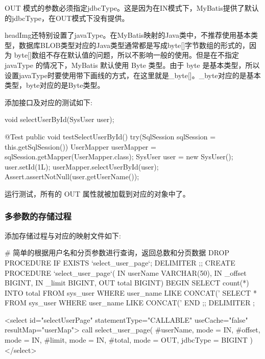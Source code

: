 OUT 模式的参数必须指定jdbcType。这是因为在IN模式下，MyBatis提供了默认的jdbcType，在OUT模式下没有提供。

headImg还特别设置了javaType。在MyBatis映射的Java类中，不推荐使用基本类型，数据库BLOB类型对应的Java类型通常都是写成byte[]字节数组的形式的，因为 byte[]数组不存在默认值的问题，所以不影响一般的使用。但是在不指定javaType 的情况下，MyBatis 默认使用 Byte 类型。由于 byte 是基本类型，所以设置javaType时要使用带下画线的方式，在这里就是\_byte[]。\_byte对应的是基本类型，byte对应的是Byte类型。

添加接口及对应的测试如下:

\begin{xml}
void selectUserById(SysUser user);
\end{xml}

\begin{Java}
@Test
public void testSelectUserById() {
    try(SqlSession sqlSession = this.getSqlSession()) {
        UserMapper userMapper = sqlSession.getMapper(UserMapper.class);
        SysUser user = new SysUser();
        user.setId(1L);
        userMapper.selectUserById(user);
        Assert.assertNotNull(user.getUserName());
    }
}
\end{Java}

运行测试，所有的 OUT 属性就被加载到对应的对象中了。

\subsubsection{多参数的存储过程}

添加存储过程与对应的映射文件如下:

\begin{sql}
# 简单的根据用户名和分页参数进行查询，返回总数和分页数据
DROP PROCEDURE IF EXISTS `select_user_page`;
DELIMITER ;;
CREATE PROCEDURE `select_user_page`(
    IN userName VARCHAR(50),
    IN _offset BIGINT,
    IN _limit BIGINT,
    OUT total BIGINT)
BEGIN
    SELECT count(*) INTO total FROM sys_user WHERE user_name LIKE CONCAT('%
    SELECT * FROM sys_user WHERE user_name LIKE CONCAT('%
END ;;
DELIMITER ;
\end{sql}

\begin{xml}
<select id="selectUserPage" statementType="CALLABLE" useCache="false" resultMap="userMap">
    {call select_user_page(
        #{userName, mode = IN},
        #{offset, mode = IN},
        #{limit, mode = IN},
        #{total, mode = OUT, jdbcType = BIGINT}
    )}
</select>
\end{xml}

